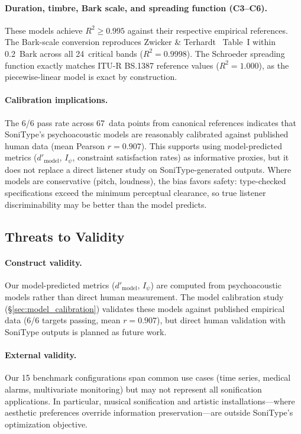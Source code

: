 \documentclass[sigchi, nonacm]{acmart}
\begin{document}
\paragraph{Duration, timbre, Bark scale, and spreading function (C3--C6).} These models achieve $R^2 \geq 0.995$ against their respective empirical references. The Bark-scale conversion reproduces Zwicker \& Terhardt~\cite{zwicker1980analytical} Table~I within 0.2~Bark across all 24~critical bands ($R^2 = 0.9998$). The Schroeder spreading function exactly matches ITU-R BS.1387 reference values ($R^2 = 1.000$), as the piecewise-linear model is exact by construction.

\paragraph{Calibration implications.} The 6/6 pass rate across 67~data points from canonical references indicates that SoniType's psychoacoustic models are reasonably calibrated against published human data (mean Pearson $r = 0.907$). This supports using model-predicted metrics ($d'_\mathrm{model}$, $I_\psi$, constraint satisfaction rates) as informative proxies, but it does not replace a direct listener study on SoniType-generated outputs. Where models are conservative (pitch, loudness), the bias favors safety: type-checked specifications exceed the minimum perceptual clearance, so true listener discriminability may be better than the model predicts.

\subsection{Threats to Validity}

\paragraph{Construct validity.} Our model-predicted metrics ($d'_\mathrm{model}$, $I_\psi$) are computed from psychoacoustic models rather than direct human measurement. The model calibration study (\S\ref{sec:model_calibration}) validates these models against published empirical data (6/6 targets passing, mean $r = 0.907$), but direct human validation with SoniType outputs is planned as future work.

\paragraph{External validity.} Our 15 benchmark configurations span common use cases (time series, medical alarms, multivariate monitoring) but may not represent all sonification applications. In particular, musical sonification and artistic installations---where aesthetic preferences override information preservation---are outside SoniType's optimization objective.
\end{document}
